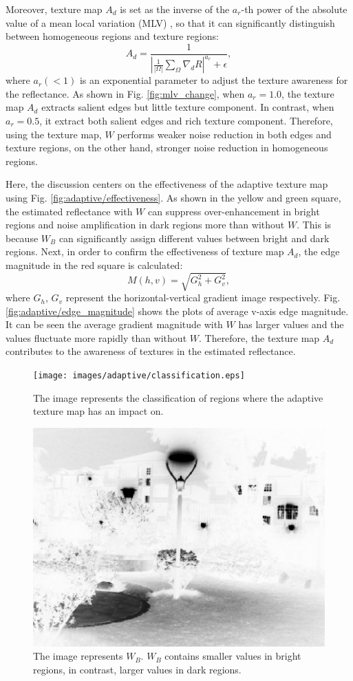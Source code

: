 Moreover, texture map $A_{d}$ is set as the inverse of the $a_{r}$-th power of the absolute value of a mean local variation (MLV) \cite{jiep}, so that it can significantly distinguish between homogeneous regions and texture regions:
\begin{equation}
A_{d} = \frac{1}{\left |\frac{1}{|\Omega|}\sum_{\Omega}\nabla_{d}{R} \right|^{a_{r}} + \epsilon}, \label{eq: mlv}
\end{equation}
where $a_{r} (< 1)$ is an exponential parameter to adjust the texture awareness for the reflectance.
As shown in Fig. \ref{fig:mlv_change}, when $a_{r}=1.0$, the texture map $A_{d}$ extracts salient edges but little texture component. In contrast, when $a_{r}=0.5$, it extract both salient edges and rich texture component. Therefore, using the texture map, $W$ performs weaker noise reduction in both edges and texture regions, on the other hand, stronger noise reduction in homogeneous regions.\par
Here, the discussion centers on the effectiveness of the adaptive texture map using Fig. \ref{fig:adaptive/effectiveness}.
As shown in the yellow and green square, the estimated reflectance with $W$ can suppress over-enhancement in bright regions and noise amplification in dark regions more than without $W$. This is because $W_{B}$ can significantly assign different values between bright and dark regions. 
Next, in order to confirm the effectiveness of texture map $A_{d}$, the edge magnitude in the red square is calculated:
\begin{equation}
M(h, v) = \sqrt{G_{h} ^{2}+ G_{v}^{2}}, \label{eq:maginitude}
\end{equation}
where $G_{h}$, $G_{v}$ represent the horizontal-vertical gradient image respectively. Fig.\ref{fig:adaptive/edge_magnitude} shows the plots of average v-axis edge magnitude. It can be seen the average gradient magnitude with $W$ has larger values and the values fluctuate more rapidly than without $W$. Therefore, the texture map $A_{d}$ contributes to the awareness of textures in the estimated reflectance.
\begin{figure}[tb]
	\centering
	\texttt{[image: images/adaptive/classification.eps]}
	\caption{The image represents the classification of regions where the adaptive texture map has an impact on.} \label{fig:adaptive/classification}
\end{figure}
\begin{figure}[tb]
	\centering
	\includegraphics[width=0.5\hsize]{images/adaptive/wb.eps}
	\caption{The image represents $W_{B}$. $W_{B}$ contains smaller values in bright regions, in contrast, larger values in dark regions.} \label{fig:adaptive/wb}
\end{figure}
